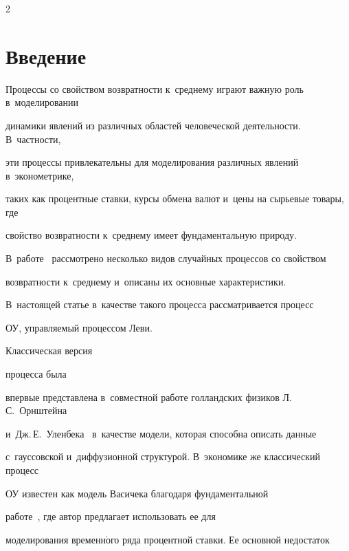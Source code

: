 \begin{multicols}{2}





\label{st\stat}





\section{Введение}





Процессы со свойством возвратности к~среднему играют важную роль в~моделировании 


динамики явлений из различных областей человеческой деятельности.  В~частности, 


эти процессы привлекательны для моделирования различных явлений в~эконометрике, 


таких как процентные ставки, курсы обмена валют и~цены на сырьевые товары, где 


свойство возвратности к~среднему имеет фундаментальную природу. 





В~работе~\cite{brigo2007} рассмотрено несколько видов случайных процессов со свойством 


возвратности к~среднему и~описаны их основные характеристики.


В~настоящей статье в~качестве такого процесса рассматривается процесс 


ОУ, управляемый процессом Леви. 





Классическая версия 


процесса была 


впервые представлена в~совместной работе голландских физиков Л.\,С.~Орнштейна 


и~Дж.\,Е.~Уленбека~\cite{ou1930} в~качестве модели, которая способна описать данные 


с~гауссовской и~диффузионной структурой. В~экономике же классический процесс 


ОУ известен как модель Васичека благодаря фундаментальной 


работе~\cite{vasicek1977}, где автор предлагает использовать ее для 


моделирования временн$\acute{\mbox{о}}$го ряда процентной ставки. Ее основной недостаток 



\end{multicols}
